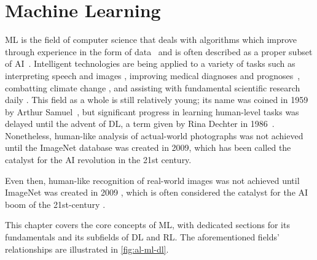 \chapter{Machine Learning}\label{chap:machine_learning}

\Gls{ML} is the field of computer science that deals with algorithms which improve through experience in the form of data~\cite{Mitchell97} and is often described as a proper subset of AI~\cite{Goodfellow-et-al-2016}. Intelligent technologies are being applied to a variety of tasks such as interpreting speech and images \cite{Farabet2013,Girshick2013,Chen2014,He2014,Shelhamer2014,Girshick2015,Ren2015,Redmon2015}, improving medical diagnoses and prognoses~\cite{Kourou2015, Abbasi2019, Singh2019, Rajkomar2019, May2021}, combatting climate change \cite{Rolnick2023}, and assisting with fundamental scientific research daily \cite{Libbrecht2015}. This field as a whole is still relatively young; its name was coined in 1959 by Arthur Samuel~\cite{5392560}, but significant progress in learning human-level tasks was delayed until the advent of \gls{DL}, a term given by Rina Dechter in 1986~\cite{Rina1986}. Nonetheless, human-like analysis of actual-world photographs was not achieved until the ImageNet database was created in 2009, which has been called the catalyst for the \gls{AI} revolution in the 21st century.



Even then, human-like recognition of real-world images was not achieved until ImageNet was created in 2009 \cite{5206848}, which is often considered the catalyst for the AI boom of the 21st-century \cite{hardy_2016}.


This chapter covers the core concepts of \gls{ML}, with dedicated sections for
its fundamentals and its subfields of \gls{DL} and \gls{RL}. The aforementioned fields' relationships are illustrated in \autoref{fig:al-ml-dl}.

